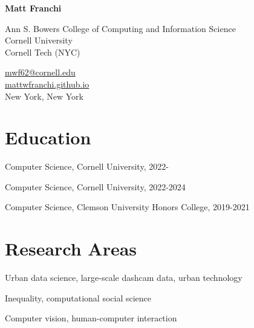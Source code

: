 \documentclass[11pt,letterpaper]{report}
\newcommand{\myname}{Matt Franchi}
\newcommand{\namefont}[1]{{\normalfont\bfseries\Huge{#1}}}
\newcommand{\listitemspace}{0.25em}
\renewenvironment{itemize}
{\begin{list}{}{\setlength{\leftmargin}{0em}
                \setlength{\parskip}{0em}
                \setlength{\itemsep}{\listitemspace}
                \setlength{\parsep}{\listitemspace}}}
{\end{list}}
\begin{document}
    \raggedright{}

    \namefont{\myname}

    \vspace{1em}
    \begin{minipage}[t]{0.700\textwidth}
         Ann S. Bowers College of Computing and Information Science \\
         Cornell University \\ 
         Cornell Tech (NYC)
    \end{minipage}
    \begin{minipage}[t]{0.295\textwidth}
        \flushright{}
        \href{mailto:mwf62@cornell.edu}{mwf62@cornell.edu} \\
        \href{https://mattwfranchi.github.io}{mattwfranchi.github.io} \\ 
        New York, New York
    \end{minipage}


    \section*{Education}

    \begin{tablist}

        \item[Ph.D. Candidate] \tab{} Computer Science, Cornell University, 2022-
        \item[M.S.] \tab{}\tab{} Computer Science, Cornell University, 2022-2024
        \item[B.S.]  \tab{}\tab{} Computer Science, Clemson University Honors College, 2019-2021

    \end{tablist}


    \section*{Research Areas}

    \begin{itemize}

        \item Urban data science, large-scale dashcam data, urban technology 
        \item Inequality, computational social science
        \item Computer vision, human-computer interaction
        

    \end{itemize}
\end{document}
